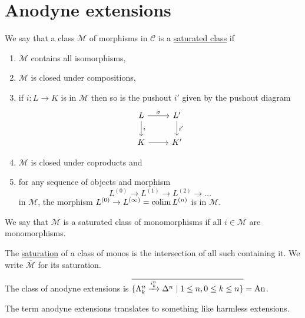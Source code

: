 \section{Anodyne extensions}


\begin{defi}
    We say that a class $\mathcal{M}$ of morphisms in $\mathcal{C}$ is a \underline{saturated class} if 
    \begin{enumerate}
        \item 
        $\mathcal{M}$ contains all isomorphisms,
        \item 
        $\mathcal{M}$ is closed under compositions,
        \item
        if $i:L \to K$ is in $\mathcal{M}$ then so is the pushout $i'$ given by the pushout diagram 
        \[
        \begin{tikzcd}
            L
            \arrow[d,"i"]
            \ar[r,"\sigma"]
            &
            L'
            \ar[d,"i'"]
            \\
            K
            \ar[r]
            &
            K'   
        \end{tikzcd}
        \]
        \item
        $\mathcal{M}$ is closed under coproducts and
        \item 
        for any sequence of objects and morphism 
        \[
        L^{(0)} \to L^{(1)} \to L^{(2)}\to \dotsc
        \]
        in $\mathcal{M}$, the morphism $L^{(0)} \to L^{(\infty)}=\operatorname{colim} L^{(n)}$ is in $\mathcal{M}$.
    \end{enumerate}
    We say that $\mathcal{M}$ is a saturated class of monomorphisms if all $i \in \mathcal{M}$ are monomorphisms.
\end{defi}

\begin{defi}
    The \underline{saturation} of a class of monos is the intersection of all such containing it. We write $\overline{\mathcal{M}}$ for its saturation.
\end{defi}

\begin{defi}
    The class of anodyne extensions is $\overline{\{ \Lambda_k^n \xrightarrow{i_k^n} \Delta^n \mid 1 \leq n ,0 \leq k \leq n \}}=\operatorname{An}$.
\end{defi}

\begin{rmk}
    The term anodyne extensions translates to something like harmless extensions.
\end{rmk}

